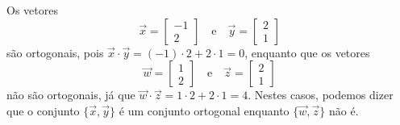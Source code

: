 \begin{ex}
	Os vetores
	\begin{equation}
	\vec{x} = \begin{bmatrix}
	-1 \\ 2
	\end{bmatrix} \quad \text{e} \quad
	\vec{y} = \begin{bmatrix}
	2 \\ 1
	\end{bmatrix}
	\end{equation} são ortogonais, pois $\vec{x} \cdot \vec{y} = (-1)\cdot 2 + 2 \cdot 1 = 0$, enquanto que os vetores
	\begin{equation}
	\vec{w} = \begin{bmatrix}
	1 \\ 2
	\end{bmatrix} \quad \text{e} \quad
	\vec{z} = \begin{bmatrix}
	2 \\ 1
	\end{bmatrix}
	\end{equation} não são ortogonais, já que $\vec{w} \cdot \vec{z} = 1\cdot 2 + 2 \cdot 1 = 4$. Nestes casos, podemos dizer que o conjunto $\{\vec{x}, \vec{y}\}$ é um conjunto ortogonal enquanto $\{\vec{w}, \vec{z}\}$ não é.
\end{ex}



